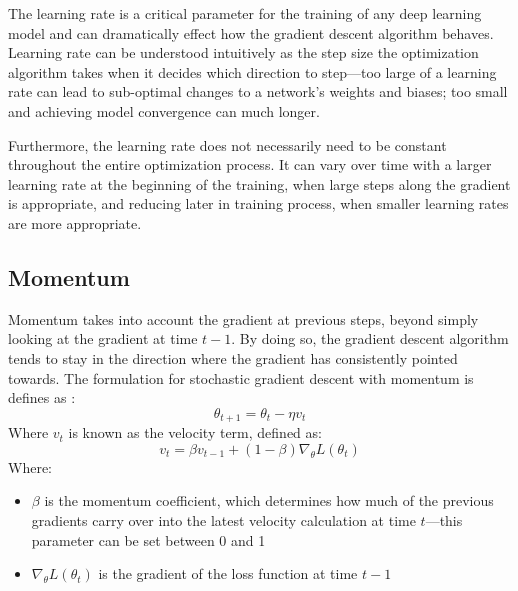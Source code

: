 \documentclass [MAS] {uclathes}
\begin{document}
The learning rate is a critical parameter for the training of any deep learning model and can dramatically effect how 
the gradient descent algorithm behaves. Learning rate can be understood intuitively as the step size the optimization 
algorithm takes when it decides which direction to step---too large of a learning rate can lead to sub-optimal changes 
to a network's weights and biases; too small and achieving model convergence can much longer.

Furthermore, the learning rate does not necessarily need to be constant throughout the entire optimization process. It 
can vary over time with a larger learning rate at the beginning of the training, when large steps along the gradient is 
appropriate, and reducing later in training process, when smaller learning rates are more appropriate.

\subsection{Momentum}
Momentum takes into account the gradient at previous steps, beyond simply looking at the gradient at time \(t-1\). By 
doing so, the gradient descent algorithm tends to stay in the direction where the gradient has consistently pointed 
towards. The formulation for stochastic gradient descent with momentum is defines as \cite{deeplearningbook}:
\[\theta_{t+1} = \theta_{t} - \eta v_{t}\]
Where \(v_{t}\) is known as the velocity term, defined as:
\[v_{t} = \beta v_{t-1} + (1 - \beta) \nabla_{\theta} L(\theta_{t})\]
Where:
\begin{itemize}
    \item \(\beta\) is the momentum coefficient, which determines how much of the previous gradients carry over into the 
    latest velocity calculation at time \(t\)---this parameter can be set between 0 and 1
    \item \(\nabla_{\theta} L(\theta_{t})\) is the gradient of the loss function at time \(t-1\)
\end{itemize}
\end{document}
